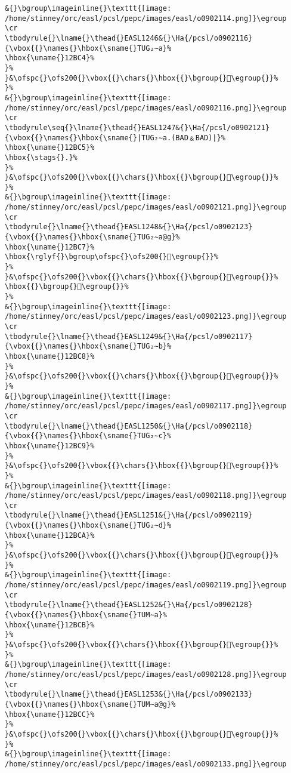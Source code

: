 \begin{verbatim}
&{}\bgroup\imageinline{}\texttt{[image: /home/stinney/orc/easl/pcsl/pepc/images/easl/o0902114.png]}\egroup
\cr
\tbodyrule{}\lname{}\thead{}EASL1246&{}\Ha{/pcsl/o0902116}{\vbox{{}\names{}\hbox{\sname{}TUG₂∼a}%
\hbox{\uname{}12BC4}%
}%
}&\ofspc{}\ofs200{}\vbox{{}\chars{}\hbox{{}\bgroup{}𒯄\egroup{}}%
}%
&{}\bgroup\imageinline{}\texttt{[image: /home/stinney/orc/easl/pcsl/pepc/images/easl/o0902116.png]}\egroup
\cr
\tbodyrule\seq{}\lname{}\thead{}EASL1247&{}\Ha{/pcsl/o0902121}{\vbox{{}\names{}\hbox{\sname{}|TUG₂∼a.(BAD﹠BAD)|}%
\hbox{\uname{}12BC5}%
\hbox{\stags{}.}%
}%
}&\ofspc{}\ofs200{}\vbox{{}\chars{}\hbox{{}\bgroup{}𒯅\egroup{}}%
}%
&{}\bgroup\imageinline{}\texttt{[image: /home/stinney/orc/easl/pcsl/pepc/images/easl/o0902121.png]}\egroup
\cr
\tbodyrule{}\lname{}\thead{}EASL1248&{}\Ha{/pcsl/o0902123}{\vbox{{}\names{}\hbox{\sname{}TUG₂∼a@g}%
\hbox{\uname{}12BC7}%
\hbox{\rglyf{}\bgroup\ofspc{}\ofs200{}𒯇\egroup{}}%
}%
}&\ofspc{}\ofs200{}\vbox{{}\chars{}\hbox{{}\bgroup{}𒯆\egroup{}}%
\hbox{{}\bgroup{}𒯇\egroup{}}%
}%
&{}\bgroup\imageinline{}\texttt{[image: /home/stinney/orc/easl/pcsl/pepc/images/easl/o0902123.png]}\egroup
\cr
\tbodyrule{}\lname{}\thead{}EASL1249&{}\Ha{/pcsl/o0902117}{\vbox{{}\names{}\hbox{\sname{}TUG₂∼b}%
\hbox{\uname{}12BC8}%
}%
}&\ofspc{}\ofs200{}\vbox{{}\chars{}\hbox{{}\bgroup{}𒯈\egroup{}}%
}%
&{}\bgroup\imageinline{}\texttt{[image: /home/stinney/orc/easl/pcsl/pepc/images/easl/o0902117.png]}\egroup
\cr
\tbodyrule{}\lname{}\thead{}EASL1250&{}\Ha{/pcsl/o0902118}{\vbox{{}\names{}\hbox{\sname{}TUG₂∼c}%
\hbox{\uname{}12BC9}%
}%
}&\ofspc{}\ofs200{}\vbox{{}\chars{}\hbox{{}\bgroup{}𒯉\egroup{}}%
}%
&{}\bgroup\imageinline{}\texttt{[image: /home/stinney/orc/easl/pcsl/pepc/images/easl/o0902118.png]}\egroup
\cr
\tbodyrule{}\lname{}\thead{}EASL1251&{}\Ha{/pcsl/o0902119}{\vbox{{}\names{}\hbox{\sname{}TUG₂∼d}%
\hbox{\uname{}12BCA}%
}%
}&\ofspc{}\ofs200{}\vbox{{}\chars{}\hbox{{}\bgroup{}𒯊\egroup{}}%
}%
&{}\bgroup\imageinline{}\texttt{[image: /home/stinney/orc/easl/pcsl/pepc/images/easl/o0902119.png]}\egroup
\cr
\tbodyrule{}\lname{}\thead{}EASL1252&{}\Ha{/pcsl/o0902128}{\vbox{{}\names{}\hbox{\sname{}TUM∼a}%
\hbox{\uname{}12BCB}%
}%
}&\ofspc{}\ofs200{}\vbox{{}\chars{}\hbox{{}\bgroup{}𒯋\egroup{}}%
}%
&{}\bgroup\imageinline{}\texttt{[image: /home/stinney/orc/easl/pcsl/pepc/images/easl/o0902128.png]}\egroup
\cr
\tbodyrule{}\lname{}\thead{}EASL1253&{}\Ha{/pcsl/o0902133}{\vbox{{}\names{}\hbox{\sname{}TUM∼a@g}%
\hbox{\uname{}12BCC}%
}%
}&\ofspc{}\ofs200{}\vbox{{}\chars{}\hbox{{}\bgroup{}𒯌\egroup{}}%
}%
&{}\bgroup\imageinline{}\texttt{[image: /home/stinney/orc/easl/pcsl/pepc/images/easl/o0902133.png]}\egroup

\end{verbatim}
